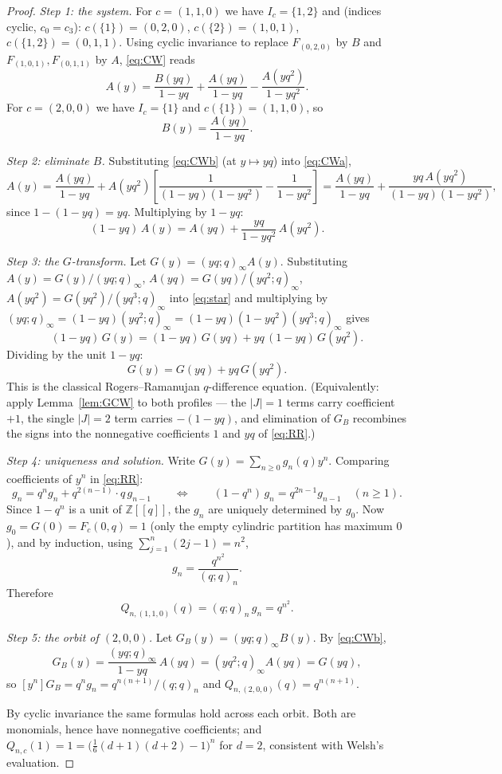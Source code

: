 \documentclass[11pt]{article}
\begin{document}
\begin{proof}
\emph{Step 1: the system.}
For $c=(1,1,0)$ we have $I_c=\{1,2\}$ and (indices cyclic, $c_0=c_3$):
$c(\{1\})=(0,2,0)$, $c(\{2\})=(1,0,1)$, $c(\{1,2\})=(0,1,1)$. Using cyclic
invariance to replace $F_{(0,2,0)}$ by $B$ and $F_{(1,0,1)},F_{(0,1,1)}$ by
$A$, \eqref{eq:CW} reads
\begin{equation}\label{eq:CWa}
A(y)=\frac{B(yq)}{1-yq}+\frac{A(yq)}{1-yq}-\frac{A(yq^2)}{1-yq^2}.
\end{equation}
For $c=(2,0,0)$ we have $I_c=\{1\}$ and $c(\{1\})=(1,1,0)$, so
\begin{equation}\label{eq:CWb}
B(y)=\frac{A(yq)}{1-yq}.
\end{equation}

\emph{Step 2: eliminate $B$.}
Substituting \eqref{eq:CWb} (at $y\mapsto yq$) into \eqref{eq:CWa},
\[
A(y)=\frac{A(yq)}{1-yq}
+A(yq^2)\left[\frac{1}{(1-yq)(1-yq^2)}-\frac{1}{1-yq^2}\right]
=\frac{A(yq)}{1-yq}+\frac{yq\,A(yq^2)}{(1-yq)(1-yq^2)},
\]
since $1-(1-yq)=yq$. Multiplying by $1-yq$:
\begin{equation}\label{eq:star}
(1-yq)\,A(y)=A(yq)+\frac{yq}{1-yq^2}\,A(yq^2).
\end{equation}

\emph{Step 3: the $G$-transform.}
Let $G(y)=(yq;q)_\infty A(y)$. Substituting
$A(y)=G(y)/(yq;q)_\infty$, $A(yq)=G(yq)/(yq^2;q)_\infty$,
$A(yq^2)=G(yq^2)/(yq^3;q)_\infty$ into \eqref{eq:star} and multiplying by
$(yq;q)_\infty=(1-yq)(yq^2;q)_\infty=(1-yq)(1-yq^2)(yq^3;q)_\infty$ gives
\[
(1-yq)\,G(y)=(1-yq)\,G(yq)+yq\,(1-yq)\,G(yq^2).
\]
Dividing by the unit $1-yq$:
\begin{equation}\label{eq:RR}
G(y)=G(yq)+yq\,G(yq^2).
\end{equation}
This is the classical Rogers--Ramanujan $q$-difference equation.
(Equivalently: apply Lemma~\ref{lem:GCW} to both profiles --- the $|J|=1$
terms carry coefficient $+1$, the single $|J|=2$ term carries $-(1-yq)$, and
elimination of $G_B$ recombines the signs into the nonnegative coefficients
$1$ and $yq$ of \eqref{eq:RR}.)

\emph{Step 4: uniqueness and solution.}
Write $G(y)=\sum_{n\ge0}g_n(q)y^n$. Comparing coefficients of $y^n$ in
\eqref{eq:RR}:
\[
g_n=q^n g_n+q^{2(n-1)}\cdot q\,g_{n-1}
\qquad\Longleftrightarrow\qquad
(1-q^n)\,g_n=q^{2n-1}g_{n-1}\quad(n\ge1).
\]
Since $1-q^n$ is a unit of $\mathbb Z[[q]]$, the $g_n$ are uniquely determined
by $g_0$. Now $g_0=G(0)=F_c(0,q)=1$ (only the empty cylindric partition has
maximum $0$), and by induction, using $\sum_{j=1}^{n}(2j-1)=n^2$,
\[
g_n=\frac{q^{n^2}}{(q;q)_n}.
\]
Therefore
\[
Q_{n,(1,1,0)}(q)=(q;q)_n\,g_n=q^{n^2}.
\]

\emph{Step 5: the orbit of $(2,0,0)$.}
Let $G_B(y)=(yq;q)_\infty B(y)$. By \eqref{eq:CWb},
\[
G_B(y)=\frac{(yq;q)_\infty}{1-yq}\,A(yq)=(yq^2;q)_\infty A(yq)=G(yq),
\]
so $[y^n]G_B=q^n g_n=q^{n(n+1)}/(q;q)_n$ and
$Q_{n,(2,0,0)}(q)=q^{n(n+1)}$.

By cyclic invariance the same formulas hold across each orbit. Both are
monomials, hence have nonnegative coefficients; and
$Q_{n,c}(1)=1=\bigl(\tfrac16(d+1)(d+2)-1\bigr)^n$ for $d=2$, consistent with
Welsh's evaluation.
\end{proof}
\end{document}
